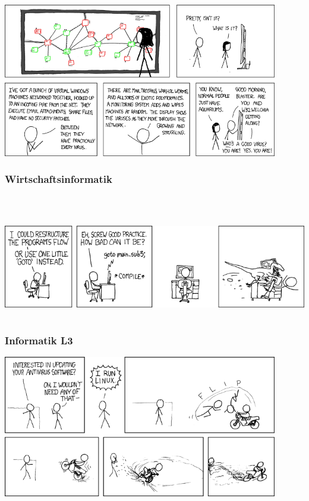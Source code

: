 \documentclass[12pt,a4paper]{scrartcl}
\begin{document}
    \begin{center}
        \includegraphics[width=0.9\textwidth]{comics/network.png}
    \end{center}

	\subsubsection{Wirtschaftsinformatik}
    \\
    \begin{center}
        \includegraphics[height=4.5cm]{comics/goto.png}
    \end{center}
\newpage
	\subsubsection{Informatik L3}
	
    \begin{center}
        \includegraphics[width=0.9\textwidth]{comics/linux_user_at_best_buy.png}
    \end{center}
\newpage
\end{document}
